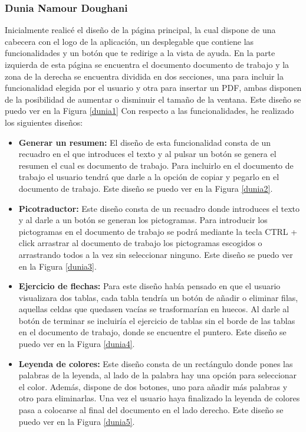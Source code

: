 \subsubsection{Dunia Namour Doughani}
Inicialmente realicé el diseño de la página principal, la cual dispone de una cabecera con el logo de la aplicación, un desplegable que contiene las funcionalidades y un botón que te redirige a la vista de ayuda. En la parte izquierda de esta página se encuentra el documento documento de trabajo y la zona de la derecha se encuentra dividida en dos secciones, una para incluir la funcionalidad elegida por el usuario y otra para insertar un PDF, ambas disponen de la posibilidad de aumentar o disminuir el tamaño de la ventana. Este diseño se puedo ver en la Figura \ref{dunia1} Con respecto a las funcionalidades, he realizado los siguientes diseños:
\begin{itemize}
  \item \textbf{Generar un resumen:} El diseño de esta funcionalidad consta de un recuadro en el que introduces el texto y al pulsar un botón se genera el resumen el cual es documento de trabajo. Para incluirlo en el documento de trabajo el usuario tendrá que darle a la opción de copiar y pegarlo en el documento de trabajo. Este diseño se puedo ver en la Figura \ref{dunia2}. 
  \item \textbf{Picotraductor:} Este diseño consta de un recuadro donde introduces el texto y al darle a un botón se generan los pictogramas. Para introducir los pictogramas en el documento de trabajo se podrá mediante la tecla CTRL + click arrastrar al documento de trabajo los pictogramas escogidos o arrastrando todos a la vez sin seleccionar ninguno. Este diseño se puedo ver en la Figura \ref{dunia3}.
  \item \textbf{Ejercicio de flechas:} Para este diseño había pensado en que el usuario visualizara dos tablas, cada tabla tendría un botón de añadir o eliminar filas, aquellas celdas que quedasen vacías se trasformarían en huecos. Al darle al botón de terminar se incluiría el ejercicio de tablas sin el borde de las tablas en el documento de trabajo, donde se encuentre el puntero. Este diseño se puedo ver en la Figura \ref{dunia4}.
  \item  \textbf{Leyenda de colores:} Este diseño consta de un rectángulo donde pones las palabras de la leyenda, al lado de la palabra hay una opción para seleccionar el color. Además, dispone de dos botones, uno para añadir más palabras y otro para eliminarlas. Una vez el usuario haya finalizado la leyenda de colores pasa a colocarse al final del documento en el lado derecho. Este diseño se puedo ver en la Figura \ref{dunia5}.

\end{itemize}
